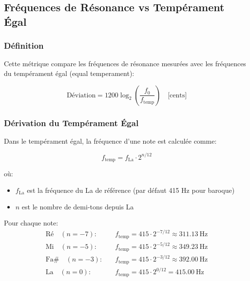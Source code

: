 \documentclass[12pt,a4paper,twocolumn]{article}
\newcommand{\freq}{f}
\newcommand{\freqzero}{f_0}
\begin{document}
\subsection{Fréquences de Résonance vs Tempérament Égal}

\subsubsection{Définition}

Cette métrique compare les fréquences de résonance mesurées avec les fréquences du tempérament égal (equal temperament):

\begin{equation}
\text{Déviation} = 1200 \log_2\left(\frac{\freqzero}{\freq_{\text{temp}}}\right) \quad \text{[cents]}
\label{eq:deviation_temperament}
\end{equation}

\subsubsection{Dérivation du Tempérament Égal}

Dans le tempérament égal, la fréquence d'une note est calculée comme:

\begin{equation}
\freq_{\text{temp}} = \freq_{\text{La}} \cdot 2^{n/12}
\label{eq:temperament_egal}
\end{equation}

où:
\begin{itemize}
    \item $\freq_{\text{La}}$ est la fréquence du La de référence (par défaut 415 Hz pour baroque)
    \item $n$ est le nombre de demi-tons depuis La
\end{itemize}

Pour chaque note:
\begin{align}
\text{Ré} \quad (n = -7): \quad &\freq_{\text{temp}} = 415 \cdot 2^{-7/12} \approx \SI{311.13}{\hertz} \\
\text{Mi} \quad (n = -5): \quad &\freq_{\text{temp}} = 415 \cdot 2^{-5/12} \approx \SI{349.23}{\hertz} \\
\text{Fa\#} \quad (n = -3): \quad &\freq_{\text{temp}} = 415 \cdot 2^{-3/12} \approx \SI{392.00}{\hertz} \\
\text{La} \quad (n = 0): \quad &\freq_{\text{temp}} = 415 \cdot 2^{0/12} = \SI{415.00}{\hertz}
\label{eq:frequences_notes}
\end{align}
\end{document}
